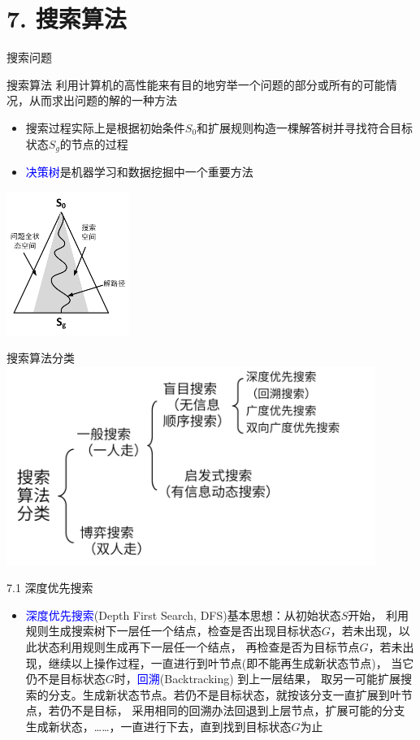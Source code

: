 


\frame{\titlepage}
\section{7. 搜索算法}
\begin{frame}{搜索问题}
    \begin{block}{搜索算法}
        利用计算机的高性能来有目的地穷举一个问题的部分或所有的可能情况，从而求出问题的解的一种方法
    \end{block}
    \begin{itemize}
        \item 搜索过程实际上是根据初始条件$S_0$和扩展规则构造一棵解答树并寻找符合目标状态$S_g$的节点的过程
        \item \textcolor{blue}{决策树}是机器学习和数据挖掘中一个重要方法
    \end{itemize}
    \includegraphics[width=0.3\textwidth,center]{fig/7-1.png}
\end{frame}
\begin{frame}{搜索算法分类}
    \includegraphics[width=0.9\textwidth,center]{fig/7-2.png}
\end{frame}
\begin{frame}{7.1 深度优先搜索}
    \begin{itemize}
        \item \textcolor{blue}{深度优先搜索}(Depth First Search, DFS)基本思想：从初始状态$S$开始，
        利用规则生成搜索树下一层任一个结点，检查是否出现目标状态$G$，若未出现，以此状态利用规则生成再下一层任一个结点，
        再检查是否为目标节点$G$，若未出现，继续以上操作过程，一直进行到叶节点(即不能再生成新状态节点)，
        当它仍不是目标状态$G$时，\textcolor{blue}{回溯}(Backtracking) 到上一层结果，
        取另一可能扩展搜索的分支。生成新状态节点。若仍不是目标状态，就按该分支一直扩展到叶节点，若仍不是目标，
        采用相同的回溯办法回退到上层节点，扩展可能的分支生成新状态，……，一直进行下去，直到找到目标状态$G$为止
    \end{itemize}
\end{frame}
